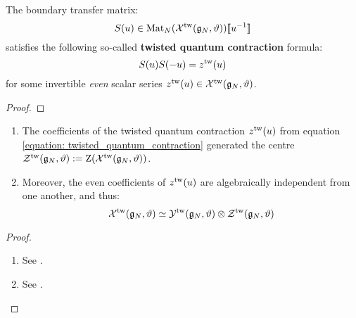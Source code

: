             \begin{lemma} \label{lemma: twisted_quantum_contractions}
                The boundary transfer matrix:
                    $$S(u) \in \mathrm{Mat}_N( \mathcal{X}^{\mathrm{tw}}(\mathfrak{g}_N, \vartheta) )[\![u^{-1}]\!]$$
                satisfies the following so-called \textbf{twisted quantum contraction} formula:
                    \begin{equation} \label{equation: twisted_quantum_contraction}
                        S(u) S(-u) = z^{\mathrm{tw}}(u)
                    \end{equation}
                for some invertible \textit{even} scalar series $z^{\mathrm{tw}}(u) \in \mathcal{X}^{\mathrm{tw}}(\mathfrak{g}_N, \vartheta)$.
            \end{lemma}
                \begin{proof}
                    
                \end{proof}
            \begin{lemma} \label{lemma: centres_of_extended_twisted_yangians}
                \begin{enumerate}
                    \item The coefficients of the twisted quantum contraction $z^{\mathrm{tw}}(u)$ from equation \eqref{equation: twisted_quantum_contraction} generated the centre $\mathcal{Z}^{\mathrm{tw}}(\mathfrak{g}_N, \vartheta) := \mathrm{Z}( \mathcal{X}^{\mathrm{tw}}(\mathfrak{g}_N, \vartheta) )$.
                    \item Moreover, the even coefficients of $z^{\mathrm{tw}}(u)$ are algebraically independent from one another, and thus:
                        $$\calX^{\tw}(\g_N, \vartheta) \cong \calY^{\tw}(\g_N, \vartheta) \tensor \calZ^{\tw}(\g_N, \vartheta)$$
                \end{enumerate}
            \end{lemma}
                \begin{proof}
                    \begin{enumerate}
                        \item See \cite[Corollary 3.5]{guay_regelskis_twisted_yangians_for_symmetric_pairs_of_types_BCD}.
                        \item See \cite[Corollary 3.6]{guay_regelskis_twisted_yangians_for_symmetric_pairs_of_types_BCD}.
                    \end{enumerate}
                \end{proof}
    
